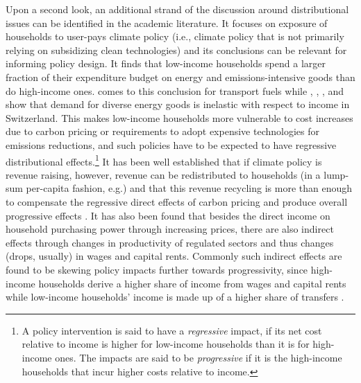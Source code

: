 \documentclass[referee, lineno, pdflatex,sn-apa]{sn-jnl}%
\theoremstyle{thmstyleone}%
\theoremstyle{thmstyletwo}%
\theoremstyle{thmstylethree}%
\begin{document}
Upon a second look, an additional strand of the discussion around distributional issues can be identified in the academic literature.
It focuses on exposure of households to user-pays climate policy (i.e., climate policy that is not primarily relying on subsidizing clean technologies) and its conclusions can be relevant for informing policy design.
It finds that low-income households spend a larger fraction of their expenditure budget on energy and emissions-intensive goods than do high-income ones.
\citet{sterner_distributional_2012} comes to this conclusion for transport fuels while \citet{weber_swiss_2017}, \citet{farsi_swiss_2024}, \citet{tilov_frugal_2020}, and \citet{ott_how_2022} show that demand for diverse energy goods is inelastic with respect to income in Switzerland.
This makes low-income households more vulnerable to cost increases due to carbon pricing or requirements to adopt expensive technologies for emissions reductions, and such policies have to be expected to have regressive distributional effects.\footnote{%
  A policy intervention is said to have a \emph{regressive} impact, if its net cost relative to income is higher for low-income households than it is for high-income ones.
  The impacts are said to be \emph{progressive} if it is the high-income households that incur higher costs relative to income.
}
It has been well established that if climate policy is revenue raising, however, revenue can be redistributed to households (in a lump-sum per-capita fashion, e.g.) and that this revenue recycling is more than enough to compensate the regressive direct effects of carbon pricing and produce overall progressive effects \citep[see, e.g.,][]{bohringer_environmental_2014, berry_distributional_2019, landis_between-_2021}.
It has also been found that besides the direct income on household purchasing power through increasing prices, there are also indirect effects through changes in productivity of regulated sectors and thus changes (drops, usually) in wages and capital rents.
Commonly such indirect effects are found to be skewing policy impacts further towards progressivity, since high-income households derive a higher share of income from wages and capital rents while low-income households' income is made up of a higher share of transfers
\citep[see][for some examples]{rausch_distributional_2011, landis_efficient_2019, landis_between-_2021}.
\end{document}
